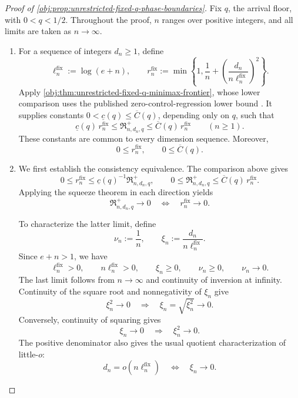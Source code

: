 \documentclass[11pt]{article}
\begin{document}
\begin{proof}[Proof of \cref{obj:prop:unrestricted-fixed-q-phase-boundaries}]
Fix \(q\), the arrival floor, with \(0<q<1/2\). Throughout the proof, \(n\) ranges over positive integers, and all limits are taken as \(n\to\infty\).

\begin{enumerate}
\item For a sequence of integers \(d_n\ge1\), define
\[
\ell_n^{\mathrm{fix}}:=\log(e+n),
\qquad
r_n^{\mathrm{fix}}
:=
\min\left\{1,\frac1n+
\left(\frac{d_n}{n\ell_n^{\mathrm{fix}}}\right)^2\right\}.
\]
Apply \cref{obj:thm:unrestricted-fixed-q-minimax-frontier}, whose lower comparison uses the published zero-control-regression lower bound
\citep[Theorem~2, Section~3.2, p.~9, and its proof in Section~C.5, pp.~39--44]{ZengBalakrishnanHanKennedy2026}.
It supplies constants \(0<\underline c(q)\le\overline C(q)\), depending only on \(q\), such that
\[
\underline c(q)\,r_n^{\mathrm{fix}}
\le \mathfrak R^{+}_{n,d_n,q}
\le \overline C(q)\,r_n^{\mathrm{fix}}
\qquad(n\ge1).
\]
These constants are common to every dimension sequence. Moreover,
\[
0\le r_n^{\mathrm{fix}},
\qquad
0\le\overline C(q).
\]

\item We first establish the consistency equivalence. The comparison above gives
\[
0\le r_n^{\mathrm{fix}}
\le \underline c(q)^{-1}\mathfrak R^{+}_{n,d_n,q},
\qquad
0\le\mathfrak R^{+}_{n,d_n,q}
\le\overline C(q)\,r_n^{\mathrm{fix}}.
\]
Applying the squeeze theorem in each direction yields
\[
\mathfrak R^{+}_{n,d_n,q}\longrightarrow0
\quad\Longleftrightarrow\quad
r_n^{\mathrm{fix}}\longrightarrow0.
\]

To characterize the latter limit, define
\[
\nu_n:=\frac1n,
\qquad
\xi_n:=\frac{d_n}{n\ell_n^{\mathrm{fix}}}.
\]
Since \(e+n>1\), we have
\[
\ell_n^{\mathrm{fix}}>0,
\qquad
n\ell_n^{\mathrm{fix}}>0,
\qquad
\xi_n\ge0,
\qquad
\nu_n\ge0,
\qquad
\nu_n\longrightarrow0.
\]
The last limit follows from \(n\to\infty\) and continuity of inversion at infinity. Continuity of the square root and nonnegativity of \(\xi_n\) give
\[
\xi_n^2\longrightarrow0
\quad\Longrightarrow\quad
\xi_n=\sqrt{\xi_n^2}\longrightarrow0.
\]
Conversely, continuity of squaring gives
\[
\xi_n\longrightarrow0
\quad\Longrightarrow\quad
\xi_n^2\longrightarrow0.
\]
The positive denominator also gives the usual quotient characterization of little-\(o\):
\[
d_n=o\!\left(n\ell_n^{\mathrm{fix}}\right)
\quad\Longleftrightarrow\quad
\xi_n\longrightarrow0.
\]


\end{enumerate}
\end{proof}
\end{document}
